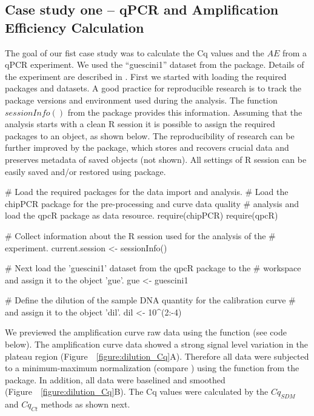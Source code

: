 \subsection{Case study one -- qPCR and Amplification Efficiency Calculation}

The goal of our fist case study was to calculate the Cq values and the $AE$ from 
a qPCR experiment. We used the ``guescini1'' dataset from the  
package. Details of the experiment are described in \citet{guescini_2008}. First 
we started with loading the required packages and datasets. A good practice for 
reproducible research is to track the package versions and environment used 
during the analysis. The function $sessionInfo()$ from the  
package provides this information. Assuming that the analysis starts with a 
clean R session it is possible to assign the required packages to an object, as 
shown below. The reproducibility of research can be further improved by the 
 package, which stores and recovers crucial data and 
preserves metadata of saved objects (not shown). All settings of R session can 
be easily saved and/or restored using  package.

\begin{example}
# Load the required packages for the data import and analysis.
# Load the chipPCR package for the pre-processing and curve data quality
# analysis and load the qpcR package as data resource.
require(chipPCR)
require(qpcR)

# Collect information about the R session used for the analysis of the
# experiment.
current.session <- sessionInfo()

# Next load the 'guescini1' dataset from the qpcR package to the
# workspace and assign it to the object 'gue'.
gue <- guescini1

# Define the dilution of the sample DNA quantity for the calibration curve 
# and assign it to the object 'dil'.
dil <- 10^(2:-4)
\end{example}

We previewed the amplification curve raw data using the  
function (see code below). The amplification curve data showed a strong signal 
level variation in the plateau region (Figure~~\ref{figure:dilution_Cq}A). 
Therefore all data were subjected to a minimum-maximum normalization (compare 
\citet{roediger_RJ_2013}) using the  function from the 
 package. In addition, all data were baselined and smoothed 
(Figure~~\ref{figure:dilution_Cq}B). The Cq values were calculated by the 
$Cq_{SDM}$ and $Cq_{Ct}$ methods as shown next.

